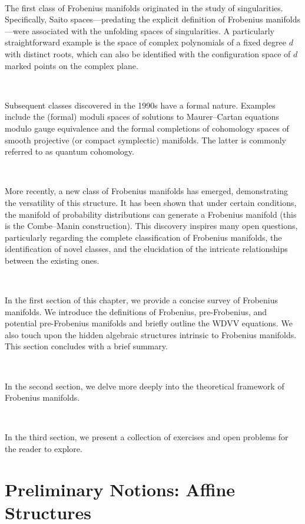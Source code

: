 \,

The first class of Frobenius manifolds originated in the study of singularities. Specifically, Saito spaces—predating the explicit definition of Frobenius manifolds—were associated with the unfolding spaces of singularities. A particularly straightforward example is the space of complex polynomials of a fixed degree $d$ with distinct roots, which can also be identified with the configuration space of $d$ marked points on the complex plane.

\,

Subsequent classes discovered in the 1990s have a formal nature. Examples include the (formal) moduli spaces of solutions to Maurer–Cartan equations modulo gauge equivalence and the formal completions of cohomology spaces of smooth projective (or compact symplectic) manifolds. The latter is commonly referred to as quantum cohomology.

\,

More recently, a new class of Frobenius manifolds has emerged, demonstrating the versatility of this structure. It has been shown that under certain conditions, the manifold of probability distributions can generate a Frobenius manifold (this is the Combe–Manin construction). This discovery inspires many open questions, particularly regarding the complete classification of Frobenius manifolds, the identification of novel classes, and the elucidation of the intricate relationships between the existing ones.

\,

In the first section of this chapter, we provide a concise survey of Frobenius manifolds. We introduce the definitions of Frobenius, pre-Frobenius, and potential pre-Frobenius manifolds and briefly outline the WDVV equations. We also touch upon the hidden algebraic structures intrinsic to Frobenius manifolds. This section concludes with a brief summary.

\,

In the second section, we delve more deeply into the theoretical framework of Frobenius manifolds.

\,

In the third section, we present a collection of exercises and open problems for the reader to explore.

\section{Preliminary Notions: Affine Structures}

